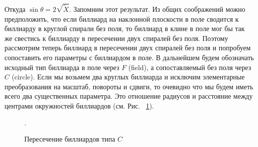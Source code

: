 \documentclass[a4paper]{article}
\begin{document}
Откуда $\sin\theta=2\sqrt{\tilde{X}}$. Запомним этот результат. Из общих соображений можно предположить, что если биллиард на наклонной плоскости в поле сводится к биллиарду в круглой спирали без поля, то биллиард в клине в поле мог бы так же свестись к биллиарду в пересечении двух спиралей без поля. Поэтому рассмотрим теперь биллиард в пересечении двух спиралей без поля и попробуем сопоставить его параметры с биллиардом в поле. В дальнейшем будем обозначать исходный тип биллиарда в поле через $F$ (field), а сопоставляемый без поля через $C$ (circle).
Если мы возьмем два круглых биллиарда и исключим элементарные преобразования на масштаб, повороты и сдвиги, то очевидно что мы будем иметь всего два существенных параметра. Это отношение радиусов и расстояние между центрами окружностей биллиардов (см. Рис. ~\ref{two-circle4}).


\begin{figure}[h]
\begin{minipage}[h]{0.49\linewidth}
\end{minipage}
\hfill
\begin{minipage}[h]{0.49\linewidth}
\end{minipage}
\caption{Пересечение биллиардов типа $C$}.  
\label{two-circle4}
\end{figure}
\end{document}
